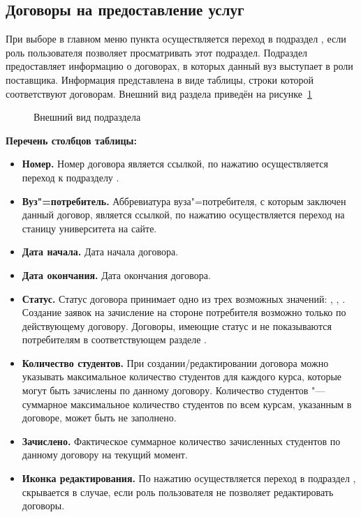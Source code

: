 	\subsection{Договоры на предоставление услуг}\label{agreement:provider_agreements_section}
При выборе в главном меню пункта  осуществляется переход в подраздел , если роль пользователя позволяет просматривать этот подраздел.
Подраздел предоставляет информацию о договорах, в которых данный вуз выступает в роли поставщика. Информация представлена в виде таблицы, строки которой соответствуют договорам. Внешний вид раздела  приведён на рисунке~\ref{agreement:provider_agreements}
	
	\begin{figure}[H]
	\caption{Внешний вид подраздела }
	\label{agreement:provider_agreements}
	\end{figure}
	
\textbf{Перечень столбцов таблицы:}
\begin{itemize}
	\item \textbf{Номер.} Номер договора является ссылкой, по нажатию осуществляется переход к подразделу .
	\item \textbf{Вуз"=потребитель.} Аббревиатура вуза"=потребителя, с которым заключен данный договор, является ссылкой, по нажатию осуществляется переход на станицу университета на сайте.
	\item \textbf{Дата начала.} Дата начала договора.
	\item \textbf{Дата окончания.} Дата окончания договора.
	\item \textbf{Статус.} Статус договора принимает одно из трех возможных значений: ,  ,  . Создание заявок на зачисление на стороне потребителя возможно только по действующему договору. Договоры, имеющие статус   и  не показываются потребителям в соответствующем разделе .
	\item \textbf{Количество студентов.} При создании/редактировании договора можно указывать максимальное количество студентов для каждого курса, которые могут быть зачислены по данному договору. Количество студентов "--- суммарное максимальное количество студентов по всем курсам, указанным в договоре, может быть не заполнено.
	\item \textbf{Зачислено.} Фактическое суммарное количество зачисленных студентов по данному договору на текущий момент.
	\item \textbf{Иконка редактирования.} По нажатию   осуществляется переход в подраздел , скрывается в случае, если роль пользователя не позволяет редактировать договоры.
\end{itemize}

